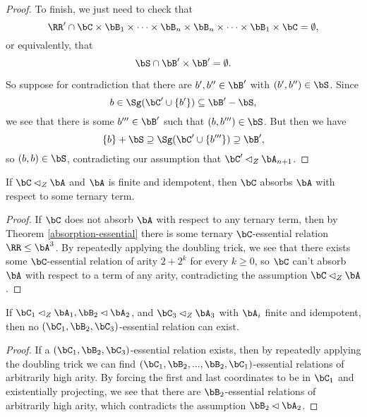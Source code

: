 \begin{proof}
To finish, we just need to check that
\[
\RR' \cap \bC\times\bB_1\times \cdots \times \bB_n \times \bB_n \times \cdots \times \bB_1 \times \bC = \emptyset,
\]
or equivalently, that
\[
\bS \cap \bB'\times \bB' = \emptyset.
\]

So suppose for contradiction that there are $b',b'' \in \bB'$ with $(b',b'') \in \bS$. Since
\[
b \in \Sg(\bC' \cup \{b'\}) \subseteq \bB' - \bS,
\]
we see that there is some $b''' \in \bB'$ such that $(b,b''') \in \bS$. But then we have
\[
\{b\} + \bS \supseteq \Sg(\bC' \cup \{b'''\}) \supseteq \bB',
\]
so $(b,b) \in \bS$, contradicting our assumption that $\bC' \lhd_Z \bA_{n+1}$.
\end{proof}

\begin{cor}\label{center-ternary} If $\bC \lhd_Z \bA$ and $\bA$ is finite and idempotent, then $\bC$ absorbs $\bA$ with respect to some ternary term.
\end{cor}
\begin{proof} If $\bC$ does not absorb $\bA$ with respect to any ternary term, then by Theorem \ref{absorption-essential} there is some ternary $\bC$-essential relation $\RR \le \bA^3$. By repeatedly applying the doubling trick, we see that there exists some $\bC$-essential relation of arity $2+2^k$ for every $k \ge 0$, so $\bC$ can't absorb $\bA$ with respect to a term of any arity, contradicting the assumption $\bC \lhd_Z \bA$.
\end{proof}

\begin{cor} If $\bC_1 \lhd_Z \bA_1, \bB_2 \lhd \bA_2$, and $\bC_3 \lhd_Z \bA_3$ with $\bA_i$ finite and idempotent, then no $(\bC_1, \bB_2, \bC_3)$-essential relation can exist.
\end{cor}
\begin{proof} If a $(\bC_1, \bB_2, \bC_3)$-essential relation exists, then by repeatedly applying the doubling trick we can find $(\bC_1, \bB_2, ..., \bB_2, \bC_1)$-essential relations of arbitrarily high arity. By forcing the first and last coordinates to be in $\bC_1$ and existentially projecting, we see that there are $\bB_2$-essential relations of arbitrarily high arity, which contradicts the assumption $\bB_2 \lhd \bA_2$.
\end{proof}

